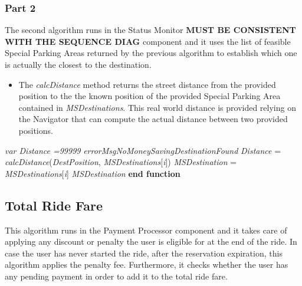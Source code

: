 \subsubsection{Part 2}

The second algorithm runs in the Status Monitor \textbf{MUST BE CONSISTENT WITH THE SEQUENCE DIAG} component and it uses the list of feasible Special Parking Areas returned by the previous algorithm to establish which one is actually the closest to the destination.

\begin{itemize}
    \item The \textit{calcDistance} method returns the street distance from the provided position to the the known position of the provided Special Parking Area contained in \textit{MSDestinations}. This real world distance is provided relying on the Navigator that can compute the actual distance between two provided positions.
\end{itemize}

\begin{algorithm}
\caption{}\label{euclid}
\begin{algorithmic}[1]
\State \textit{var Distance =99999}
\State\Return \textit{errorMsgNoMoneySavingDestinationFound}
\EndIf
{}
\State \textit{Distance} = \textit{calcDistance}(\textit{DestPosition}, \textit{MSDestinations}[\textit{i}])
\State \textit{MSDestination} = \textit{MSDestinations}[\textit{i}]
\EndIf
\EndFor
\State\Return \textit{MSDestination}
\EndFunction
\State \textbf{end function}
\end{algorithmic}
\end{algorithm}

\newpage


\subsection{Total Ride Fare}
This algorithm runs in the Payment Processor component and it takes care of applying any discount or penalty the user is eligible for at the end of the ride. In case the user has never started the ride, after the reservation expiration, this algorithm applies the penalty fee. Furthermore, it checks whether the user has any pending payment in order to add it to the total ride fare.

